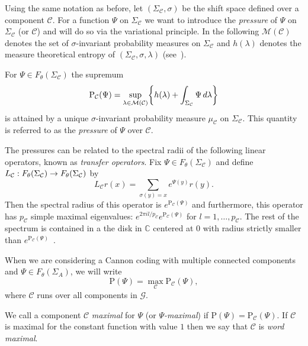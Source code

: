 \documentclass[AHL,Unicode,longabstracts,published]{cedram}
\newcommand{\m}{\mu}
\newcommand{\s}{\sigma}
\renewcommand{\SS}{\Sigma}
\renewcommand{\P}{\Psi}
\newcommand{\Cc}{\mathcal{C}}
\newcommand{\Mcc}{\mathcal{M}}
\newcommand{\Gc}{\mathcal{G}}
\newcommand{\C}{\mathbb{C}}
\renewcommand{\Pr}{\mathbb{P}}
\newcommand*\rmP{\mathrm{P}}
\let\originalleft\left
\let\originalright\right
\renewcommand{\left}{\mathopen{}\mathclose\bgroup\originalleft}
\renewcommand{\right}{\aftergroup\egroup\originalright}
\renewcommand*{\to}{\mathchoice{\longrightarrow}{\rightarrow}{\rightarrow}{\rightarrow}}
\theoremstyle{plain}
\begin{document}
Using the same notation as before, let $(\SS_\Cc, \sigma)$ be the shift space defined over a component $\Cc$. For a function $\Psi$ on $\SS_\Cc$ we want to introduce the \emph{pressure} of $\P$ on $\SS_\Cc$ (or $\Cc$) and will do so via the variational principle. In the following $\Mcc(\Cc)$ denotes the set of $\sigma$-invariant probability measures on $\SS_\Cc$ and $h(\lambda)$ denotes the measure theoretical entropy of $(\Sigma_\Cc, \sigma, \lambda)$ (see~\cite[Section~3]{ParryPollicott}).

\begin{prop}\label{prop.vp}
For $\P \in F_\theta(\Sigma_\Cc)$ the supremum
\[
\rmP_\Cc(\P) =\sup_{\lambda \in \Mcc(\Cc)}\left\{h(\lambda)+\int_{\SS_\Cc}\P\,d\lambda\right\}
\]
is attained by a unique $\sigma$-invariant probability measure $\m_\Cc$ on $\Sigma_\Cc$. This quantity is referred to as the \emph{pressure} of $\P$ over $\Cc$.
\end{prop}

The pressures can be related to the spectral radii of the following linear operators, known as \emph{transfer operators}. Fix $\P \in F_\theta(\SS_\Cc)$ and define $L_\Cc : F_\theta(\SS_\Cc) \to F_\theta(\SS_\Cc)$ by
\[
L_{\Cc} r(x) = \sum_{\s(y) = x} e^{\P(y)} r(y).
\]
Then the spectral radius of this operator is $e^{\rmP_\Cc(\P)}$ and furthermore, this operator has $p_\Cc$ simple maximal eigenvalues: $e^{2\pi i l/p_\Cc}e^{\rmP_\Cc(\P)}$ for $l =1, \dots, p_\Cc$. The rest of the spectrum is contained in a the disk in $\C$ centered at $0$ with radius strictly smaller than $e^{\rmP_\Cc(\P)}$~\cite{ParryPollicott}.

When we are considering a Cannon coding with multiple connected components and $\P \in F_\theta(\SS_A)$, we will write
\[
\rmP(\P)=\max_\Cc \rmP_\Cc(\P),
\]
where $\Cc$ runs over all components in $\Gc$.
\begin{defi}
We call a component $\Cc$ \emph{maximal} for $\P$ (or \emph{$\P$-maximal}) if $\rmP(\P)=\rmP_\Cc(\P)$. If $\Cc$ is maximal for the constant function with value $1$ then we say that $\Cc$ is \emph{word maximal}.
\end{defi}
\end{document}

